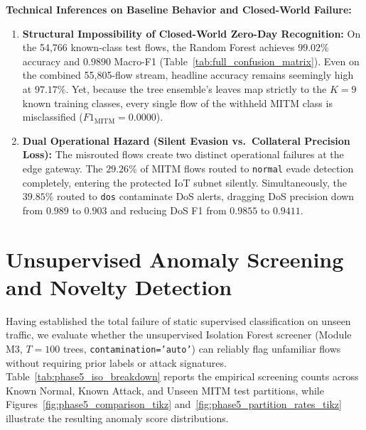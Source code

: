 \textbf{Technical Inferences on Baseline Behavior and Closed-World Failure:}
\begin{enumerate}
    \item \textbf{Structural Impossibility of Closed-World Zero-Day Recognition:} On the 54{,}766 known-class test flows, the Random Forest achieves $99.02\%$ accuracy and $0.9890$ Macro-F1 (Table~\ref{tab:full_confusion_matrix}). Even on the combined 55{,}805-flow stream, headline accuracy remains seemingly high at $97.17\%$. Yet, because the tree ensemble's leaves map strictly to the $K = 9$ known training classes, every single flow of the withheld MITM class is misclassified ($F1_{\text{MITM}} = 0.0000$).
    \item \textbf{Dual Operational Hazard (Silent Evasion vs.\ Collateral Precision Loss):} The misrouted flows create two distinct operational failures at the edge gateway. The $29.26\%$ of MITM flows routed to \texttt{normal} evade detection completely, entering the protected IoT subnet silently. Simultaneously, the $39.85\%$ routed to \texttt{dos} contaminate DoS alerts, dragging DoS precision down from $0.989$ to $0.903$ and reducing DoS F1 from $0.9855$ to $0.9411$.
\end{enumerate}

\section{Unsupervised Anomaly Screening and Novelty Detection}
\label{sec:phase5_results}

Having established the total failure of static supervised classification on unseen traffic, we evaluate whether the unsupervised Isolation Forest screener (Module M3, $T = 100$ trees, \texttt{contamination='auto'}) can reliably flag unfamiliar flows without requiring prior labels or attack signatures. Table~\ref{tab:phase5_iso_breakdown} reports the empirical screening counts across Known Normal, Known Attack, and Unseen MITM test partitions, while Figures~\ref{fig:phase5_comparison_tikz} and~\ref{fig:phase5_partition_rates_tikz} illustrate the resulting anomaly score distributions.

